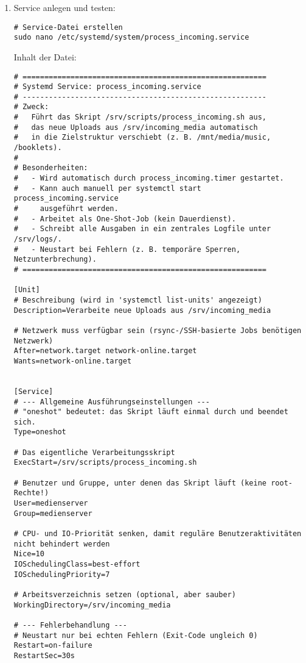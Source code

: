 \documentclass[12pt,a4paper]{report}
\begin{document}
  \begin{enumerate}
    \item Service anlegen und testen:
    \begin{verbatim}
# Service-Datei erstellen
sudo nano /etc/systemd/system/process_incoming.service
    \end{verbatim}

    Inhalt der Datei:
    \begin{verbatim}
# ========================================================
# Systemd Service: process_incoming.service
# --------------------------------------------------------
# Zweck:
#   Führt das Skript /srv/scripts/process_incoming.sh aus,
#   das neue Uploads aus /srv/incoming_media automatisch
#   in die Zielstruktur verschiebt (z. B. /mnt/media/music, /booklets).
#
# Besonderheiten:
#   - Wird automatisch durch process_incoming.timer gestartet.
#   - Kann auch manuell per systemctl start process_incoming.service
#     ausgeführt werden.
#   - Arbeitet als One-Shot-Job (kein Dauerdienst).
#   - Schreibt alle Ausgaben in ein zentrales Logfile unter /srv/logs/.
#   - Neustart bei Fehlern (z. B. temporäre Sperren, Netzunterbrechung).
# ========================================================

[Unit]
# Beschreibung (wird in 'systemctl list-units' angezeigt)
Description=Verarbeite neue Uploads aus /srv/incoming_media

# Netzwerk muss verfügbar sein (rsync-/SSH-basierte Jobs benötigen Netzwerk)
After=network.target network-online.target
Wants=network-online.target


[Service]
# --- Allgemeine Ausführungseinstellungen ---
# "oneshot" bedeutet: das Skript läuft einmal durch und beendet sich.
Type=oneshot

# Das eigentliche Verarbeitungsskript
ExecStart=/srv/scripts/process_incoming.sh

# Benutzer und Gruppe, unter denen das Skript läuft (keine root-Rechte!)
User=medienserver
Group=medienserver

# CPU- und IO-Priorität senken, damit reguläre Benutzeraktivitäten nicht behindert werden
Nice=10
IOSchedulingClass=best-effort
IOSchedulingPriority=7

# Arbeitsverzeichnis setzen (optional, aber sauber)
WorkingDirectory=/srv/incoming_media

# --- Fehlerbehandlung ---
# Neustart nur bei echten Fehlern (Exit-Code ungleich 0)
Restart=on-failure
RestartSec=30s


\end{verbatim}
\end{enumerate}
\end{document}
